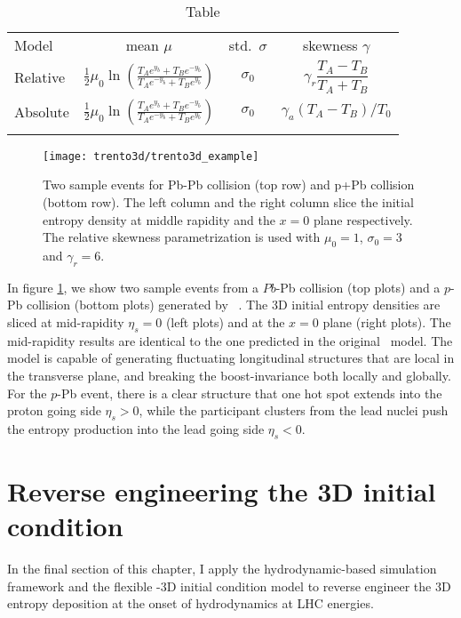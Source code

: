 \begin{table}
\centering
\caption{Table}\label{tab:parametrization}
\begin{tabular}{lccc}
\paddedhline
Model & mean $\mu$ & std.\ $\sigma$ & skewness $\gamma$ \\
\paddedhline \noalign{\smallskip}
Relative  & $\frac{1}{2} \mu_0 \ln\left(\frac{T_A e^{y_b}+T_B e^{-y_b}}{T_A e^{-y_b} + T_B e^{y_b}}\right)$ & $\sigma_0$ & $\gamma_r \dfrac{T_A - T_B}{T_A + T_B}$ \smallskip\\
Absolute & $\frac{1}{2} \mu_0 \ln\left(\frac{T_A e^{y_b}+T_B e^{-y_b}}{T_A e^{-y_b} + T_B e^{y_b}}\right)$  & $\sigma_0$ & $\gamma_a (T_A - T_B)/T_0$\smallskip\\
\paddedhline 
\end{tabular}
\end{table}

\begin{figure}
\centering
\texttt{[image: trento3d/trento3d\_example]}
\caption{Two sample events for Pb-Pb collision (top row) and p+Pb collision (bottom row). The left column and the right column slice the initial entropy density at middle rapidity and the $x=0$ plane respectively. The relative skewness parametrization is used with $\mu_0=1$, $\sigma_0=3$ and $\gamma_r=6$.}
\label{fig:3d-example}
\end{figure}

In figure \ref{fig:3d-example}, we show two sample events from a $Pb$-Pb collision (top plots) and a $p$-Pb collision (bottom plots) generated by \trento\ .
The 3D initial entropy densities are sliced at mid-rapidity $\eta_s=0$ (left plots) and at the $x=0$ plane (right plots).
The mid-rapidity results are identical to the one predicted in the original \trento\ model.
The model is capable of generating fluctuating longitudinal structures that are local in the transverse plane, and breaking the boost-invariance both locally and globally.
For the $p$-Pb event, there is a clear structure that one hot spot extends into the proton going side $\eta_s >0$, while the participant clusters from the lead nuclei push the entropy production into the lead going side $\eta_s <0$.

\section{Reverse engineering the 3D initial condition}
In the final section of this chapter, I apply the hydrodynamic-based simulation framework and the flexible \trento-3D initial condition model to reverse engineer the 3D entropy deposition at the onset of hydrodynamics at LHC energies.

